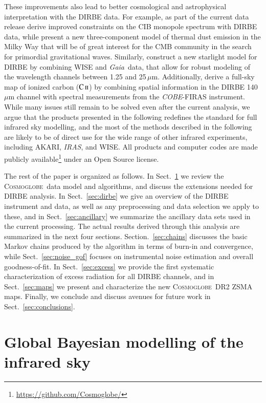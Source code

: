\documentclass{aa}
\def\COBE{\textit{COBE}}
\def\GAIA{\textit{Gaia}}
\def\AKARI{\textrm{{AKARI}}}
\def\IRAS{\textit{{IRAS}}}
\newcommand{\CII}{\ensuremath{\textsc{C\,ii}}}
\newcommand{\cosmoglobe}{\textsc{Cosmoglobe}}
\begin{document}
These improvements also lead to better cosmological and astrophysical interpretation with the DIRBE data. For example, as part of the current data release \citet{CG02_03} derive improved constraints on the CIB monopole spectrum with DIRBE data, while \citet{CG02_05} present a new three-component model of thermal dust emission in the Milky Way that will be of great interest for the CMB community in the search for primordial gravitational waves. Similarly, \citet{CG02_04} construct a new starlight model for DIRBE by combining WISE and \GAIA\ data, that allow for robust modeling of the wavelength channels between 1.25 and 25$\,\mu$m. Additionally, \citet{CG02_06} derive a full-sky map of ionized carbon (\CII) by combining spatial information in the DIRBE 140\,$\mu$m channel with spectral measurements from the \COBE-FIRAS instrument. While many issues still remain to be solved even after the current analysis, we argue that the products presented in the following redefines the standard for full infrared sky modelling, and the most of the methods described in the following are likely to be of direct use for the wide range of other infrared experiments, including \AKARI, \IRAS, and WISE. All products and computer codes are made publicly available\footnote{\url{https://github.com/Cosmoglobe/}} under an Open Source license.

The rest of the paper is organized as follows. In Sect.~\ref{sec:global_modelling} we review the \cosmoglobe\ data model and algorithms, and discuss the extensions needed for DIRBE analysis. In Sect.~\ref{sec:dirbe} we give an overview of the DIRBE instrument and data, as well as any preprocessing and data selection we apply to these, and in Sect.~\ref{sec:ancillary} we summarize the ancillary data sets used in the current processing. The actual results derived through this analysis are summarized in the next four sections. Section.~\ref{sec:chains} discusses the basic Markov chains produced by the algorithm in terms of burn-in and convergence, while Sect.~\ref{sec:noise_gof} focuses on instrumental noise estimation and overall goodness-of-fit. In Sect.~\ref{sec:excess} we provide the first systematic characterization of excess radiation for all DIRBE channels, and in Sect.~\ref{sec:maps} we present and characterize the new \cosmoglobe\ DR2 ZSMA maps. Finally, we conclude and discuss avenues for future work in Sect.~\ref{sec:conclusions}. 

\section{Global Bayesian modelling of the infrared sky}
\label{sec:global_modelling}
\end{document}
